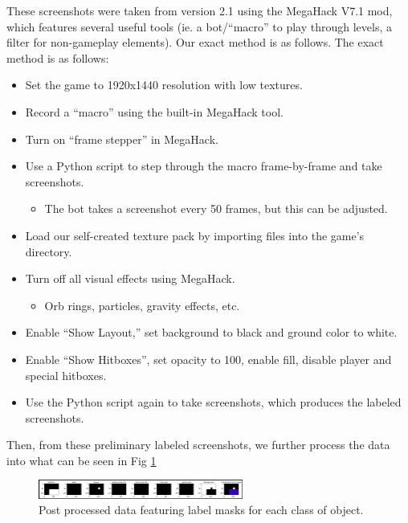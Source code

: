 \documentclass{article} %
\begin{document}
	These screenshots were taken from version 2.1 using the MegaHack V7.1 mod, which features several useful tools (ie. a bot/“macro” to play through levels, a filter for non-gameplay elements). Our exact method is as follows. The exact method is as follows:

\begin{itemize}
    \item Set the game to 1920x1440 resolution with low textures.
    \item Record a “macro” using the built-in MegaHack tool.
    \item Turn on “frame stepper” in MegaHack.
    \item Use a Python script to step through the macro frame-by-frame and take screenshots.
    \begin{itemize}
        \item The bot takes a screenshot every 50 frames, but this can be adjusted.
    \end{itemize}
    \item Load our self-created texture pack by importing files into the game’s directory.
    \item Turn off all visual effects using MegaHack.
    \begin{itemize}
        \item Orb rings, particles, gravity effects, etc.
    \end{itemize}
    \item Enable “Show Layout,” set background to black and ground color to white.
    \item Enable “Show Hitboxes”, set opacity to 100, enable fill, disable player and special hitboxes.
    \item Use the Python script again to take screenshots, which produces the labeled screenshots.
\end{itemize}


Then, from these preliminary labeled screenshots, we further process the data into what can be seen in Fig \ref{fig:labels after post processing}

\begin{figure}[!h]
\begin{center}
\includegraphics[width=0.6\textwidth]{Figs/labels after post processing.png}
\end{center}
\caption{Post processed data featuring label masks for each class of object.}
\label{fig:labels after post processing}
\end{figure}
\end{document}
